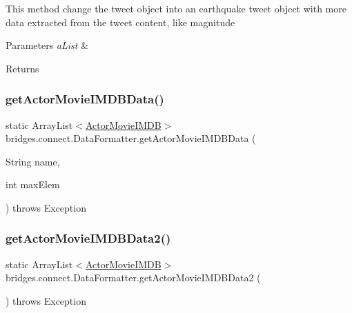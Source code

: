 This method change the tweet object into an earthquake tweet object with more data extracted from the tweet content, like magnitude 
\begin{DoxyParams}{Parameters}
{\em a\+List} & \\
\hline
\end{DoxyParams}
\begin{DoxyReturn}{Returns}

\end{DoxyReturn}
\hypertarget{classbridges_1_1connect_1_1_data_formatter_a403ece4f61c11b75a0318ea565669165}{}\label{classbridges_1_1connect_1_1_data_formatter_a403ece4f61c11b75a0318ea565669165} 
\subsubsection{\texorpdfstring{get\+Actor\+Movie\+I\+M\+D\+B\+Data()}{getActorMovieIMDBData()}}
{\footnotesize\ttfamily static Array\+List$<$\hyperlink{classbridges_1_1data__src__dependent_1_1_actor_movie_i_m_d_b}{Actor\+Movie\+I\+M\+DB}$>$ bridges.\+connect.\+Data\+Formatter.\+get\+Actor\+Movie\+I\+M\+D\+B\+Data (\begin{DoxyParamCaption}\item[{String}]{name,  }\item[{int}]{max\+Elem }\end{DoxyParamCaption}) throws Exception\hspace{0.3cm}{\ttfamily [static]}}

\hypertarget{classbridges_1_1connect_1_1_data_formatter_a9b599616c4d7a502f9fab8663173db6d}{}\label{classbridges_1_1connect_1_1_data_formatter_a9b599616c4d7a502f9fab8663173db6d} 
\subsubsection{\texorpdfstring{get\+Actor\+Movie\+I\+M\+D\+B\+Data2()}{getActorMovieIMDBData2()}}
{\footnotesize\ttfamily static Array\+List$<$\hyperlink{classbridges_1_1data__src__dependent_1_1_actor_movie_i_m_d_b}{Actor\+Movie\+I\+M\+DB}$>$ bridges.\+connect.\+Data\+Formatter.\+get\+Actor\+Movie\+I\+M\+D\+B\+Data2 (\begin{DoxyParamCaption}{ }\end{DoxyParamCaption}) throws Exception\hspace{0.3cm}{\ttfamily [static]}}

